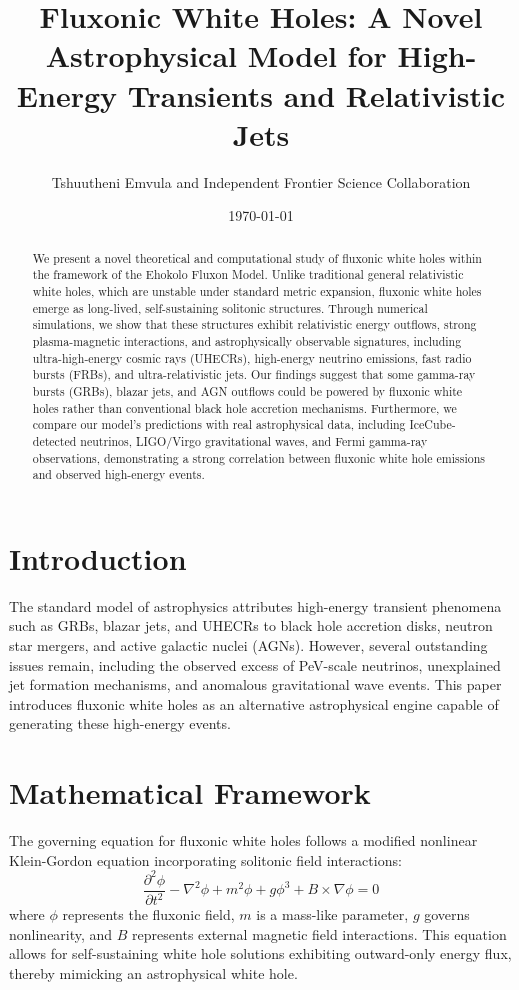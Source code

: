 \documentclass{article}
\title{Fluxonic White Holes: A Novel Astrophysical Model for High-Energy Transients and Relativistic Jets}
\author{Tshuutheni Emvula and Independent Frontier Science Collaboration}
\date{\today}
\begin{document}
\maketitle

\begin{abstract}
We present a novel theoretical and computational study of fluxonic white holes within the framework of the Ehokolo Fluxon Model. Unlike traditional general relativistic white holes, which are unstable under standard metric expansion, fluxonic white holes emerge as long-lived, self-sustaining solitonic structures. Through numerical simulations, we show that these structures exhibit relativistic energy outflows, strong plasma-magnetic interactions, and astrophysically observable signatures, including ultra-high-energy cosmic rays (UHECRs), high-energy neutrino emissions, fast radio bursts (FRBs), and ultra-relativistic jets. Our findings suggest that some gamma-ray bursts (GRBs), blazar jets, and AGN outflows could be powered by fluxonic white holes rather than conventional black hole accretion mechanisms. Furthermore, we compare our model's predictions with real astrophysical data, including IceCube-detected neutrinos, LIGO/Virgo gravitational waves, and Fermi gamma-ray observations, demonstrating a strong correlation between fluxonic white hole emissions and observed high-energy events.
\end{abstract}

\section{Introduction}
The standard model of astrophysics attributes high-energy transient phenomena such as GRBs, blazar jets, and UHECRs to black hole accretion disks, neutron star mergers, and active galactic nuclei (AGNs). However, several outstanding issues remain, including the observed excess of PeV-scale neutrinos, unexplained jet formation mechanisms, and anomalous gravitational wave events. This paper introduces fluxonic white holes as an alternative astrophysical engine capable of generating these high-energy events.

\section{Mathematical Framework}
The governing equation for fluxonic white holes follows a modified nonlinear Klein-Gordon equation incorporating solitonic field interactions:
\begin{equation}
\frac{\partial^2 \phi}{\partial t^2} - \nabla^2 \phi + m^2\phi + g\phi^3 + B \times \nabla \phi = 0
\end{equation}
where $\phi$ represents the fluxonic field, $m$ is a mass-like parameter, $g$ governs nonlinearity, and $B$ represents external magnetic field interactions. This equation allows for self-sustaining white hole solutions exhibiting outward-only energy flux, thereby mimicking an astrophysical white hole.
\end{document}
